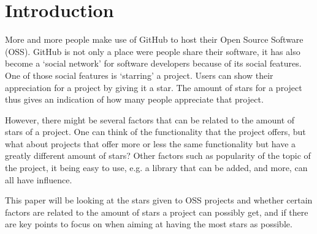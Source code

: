 \section{Introduction}
    More and more people make use of GitHub to host their Open Source Software (OSS)\cite{github-2013}. 
    GitHub is not only a place were people share their software, it has also become a `social network' for software developers because of its social features. \cite{dabbish-2012} 
    One of those social features is `starring' a project. Users can show their appreciation for a project by giving it a  star. The amount of stars for a project thus gives an indication of how many people appreciate that project.
    
    However, there might be several factors that can be related to the amount of stars of a project. 
    One can think of the functionality that the project offers, but what about projects that offer more or less the same functionality but have a greatly different amount of stars? Other factors such as popularity of the topic of the project, it being easy to use, e.g. a library that can be added, and more, can all have influence.
    
    This paper will be looking at the stars given to OSS projects and whether certain factors are related to the amount of stars a project can possibly get, and if there are key points to focus on when aiming at having the most stars as possible.





